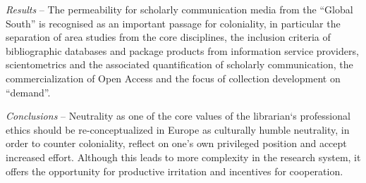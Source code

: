 \textit{Results} -- The permeability for scholarly communication media from the
\enquote{Global South} is recognised as an important passage for coloniality,
in particular the separation of area studies from the core disciplines,
the inclusion criteria of bibliographic databases and package products
from information service providers, scientometrics and the associated
quantification of scholarly communication, the commercialization of Open
Access and the focus of collection development on \enquote{demand}.

\textit{Conclusions} -- Neutrality as one of the core values of the librarian`s
professional ethics should be re-conceptualized in Europe as culturally
humble neutrality, in order to counter coloniality, reflect on one's own
privileged position and accept increased effort. Although this leads to
more complexity in the research system, it offers the opportunity for
productive irritation and incentives for cooperation.
